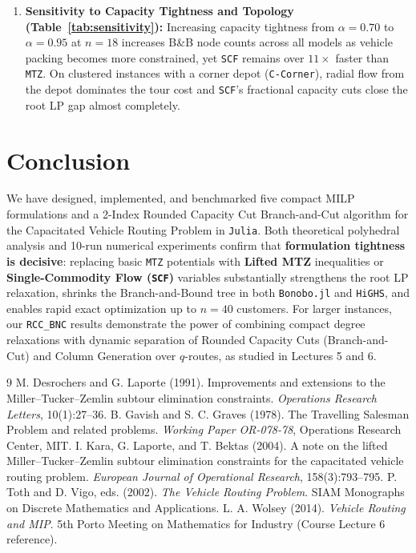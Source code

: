 \documentclass[11pt,a4paper]{article}
\begin{document}
\begin{enumerate}[noitemsep,topsep=3pt]
    \item \textbf{Sensitivity to Capacity Tightness and Topology (Table~\ref{tab:sensitivity}):} Increasing capacity tightness from $\alpha = 0.70$ to $\alpha = 0.95$ at $n = 18$ increases B\&B node counts across all models as vehicle packing becomes more constrained, yet \texttt{SCF} remains over $11\times$ faster than \texttt{MTZ}. On clustered instances with a corner depot (\texttt{C-Corner}), radial flow from the depot dominates the tour cost and \texttt{SCF}'s fractional capacity cuts close the root LP gap almost completely.
\end{enumerate}

\section{Conclusion}
We have designed, implemented, and benchmarked five compact MILP formulations and a 2-Index Rounded Capacity Cut Branch-and-Cut algorithm for the Capacitated Vehicle Routing Problem in \texttt{Julia}. Both theoretical polyhedral analysis and 10-run numerical experiments confirm that \textbf{formulation tightness is decisive}: replacing basic \texttt{MTZ} potentials with \textbf{Lifted MTZ} inequalities or \textbf{Single-Commodity Flow (\texttt{SCF})} variables substantially strengthens the root LP relaxation, shrinks the Branch-and-Bound tree in both \texttt{Bonobo.jl} and \texttt{HiGHS}, and enables rapid exact optimization up to $n = 40$ customers. For larger instances, our \texttt{RCC\_BNC} results demonstrate the power of combining compact degree relaxations with dynamic separation of Rounded Capacity Cuts (Branch-and-Cut) and Column Generation over $q$-routes, as studied in Lectures 5 and 6.

\begin{thebibliography}{9}
\small
{} M. Desrochers and G. Laporte (1991). Improvements and extensions to the Miller--Tucker--Zemlin subtour elimination constraints. \emph{Operations Research Letters}, 10(1):27--36.
 B. Gavish and S. C. Graves (1978). The Travelling Salesman Problem and related problems. \emph{Working Paper OR-078-78}, Operations Research Center, MIT.
 I. Kara, G. Laporte, and T. Bektas (2004). A note on the lifted Miller--Tucker--Zemlin subtour elimination constraints for the capacitated vehicle routing problem. \emph{European Journal of Operational Research}, 158(3):793--795.
 P. Toth and D. Vigo, eds. (2002). \emph{The Vehicle Routing Problem}. SIAM Monographs on Discrete Mathematics and Applications.
 L. A. Wolsey (2014). \emph{Vehicle Routing and MIP}. 5th Porto Meeting on Mathematics for Industry (Course Lecture 6 reference).
\end{thebibliography}
\end{document}
